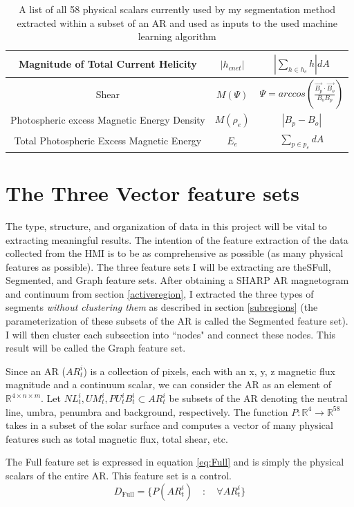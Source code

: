 \documentclass[defaultstyle,11pt]{thesis}
\begin{document}
\begin{table}[p!]
\begin{tabular}{||c c c||}
 \hline
 Magnitude of Total Current Helicity & $|h_{c net}|$ & $|\sum_{h \in h_c}h|dA$ \\
 \hline
 Shear & $M(\Psi)$ & $\Psi = arccos(\frac{\vec{B_p} \cdot \vec{B_o}}{B_oB_p})$ \\
 \hline
 Photospheric excess Magnetic Energy Density & $M(\rho_e)$ & $|B_p - B_o|$ \\
 \hline
 Total Photospheric Excess Magnetic Energy & $E_e$ & $\sum_{p \in p_e}dA$ \\
 \hline
 \end{tabular}
 \caption{A list of all 58 physical scalars currently used by my segmentation method extracted within a subset of an AR and used as inputs to the used machine learning algorithm}
 \label{fig:parameters}
\end{table}

\section{The Three Vector feature sets}
The type, structure, and organization of data in this project will be vital to extracting meaningful results. The intention of the feature extraction of the data collected from the HMI is to be as comprehensive as possible (as many physical features as possible). The three feature sets I will be extracting are theSFull, Segmented, and Graph feature sets. After obtaining a SHARP AR magnetogram and continuum from section \ref{activeregion}, I extracted the three types of segments \textit{without clustering them} as described in section \ref{subregions} (the parameterization of these subsets of the AR is called the Segmented feature set). I will then cluster each subsection into ``nodes" and connect these nodes. This result will be called the Graph feature set.

Since an AR ($AR_t^i$) is a collection of pixels, each with an x, y, z magnetic flux magnitude and a continuum scalar, we can consider the AR as an element of $\mathbb{R}^{4 \times n\times m}$. Let $NL_t^i, UM_t^i, PU_t^i B_t^i\subset AR_t^i$ be subsets of the AR denoting the neutral line, umbra, penumbra and background, respectively. The function $P : \mathbb{R}^{4} \rightarrow \mathbb{R}^{58}$ takes in a subset of the solar surface and computes a vector of many physical features such as total magnetic flux, total shear, etc. 

The Full feature set is expressed in equation \ref{eq:Full} and is simply the physical scalars of the entire AR. This feature set is a control.
\begin{equation}
    D_{\text{Full}} = \{P(AR_t^i) \quad : \quad \forall AR_t^i\}
    \label{eq:Full}
\end{equation}
\end{document}
